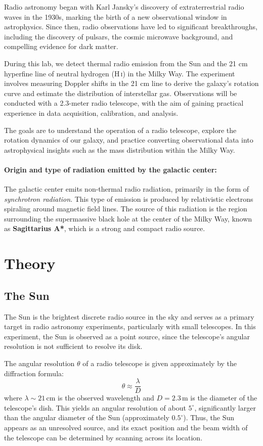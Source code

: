 \documentclass[12pt,a4paper]{article}
\begin{document}
Radio astronomy began with Karl Jansky's discovery of extraterrestrial radio waves in the 1930s, marking the birth of a new observational window in astrophysics. Since then, radio observations have led to significant breakthroughs, including the discovery of pulsars, the cosmic microwave background, and compelling evidence for dark matter.

During this lab, we detect thermal radio emission from the Sun and the 21 cm hyperfine line of neutral hydrogen (H\,\textsc{i}) in the Milky Way. The experiment involves measuring Doppler shifts in the 21 cm line to derive the galaxy's rotation curve and estimate the distribution of interstellar gas. Observations will be conducted with a 2.3-meter radio telescope, with the aim of gaining practical experience in data acquisition, calibration, and analysis.

The goals are to understand the operation of a radio telescope, explore the rotation dynamics of our galaxy, and practice converting observational data into astrophysical insights such as the mass distribution within the Milky Way.

\paragraph{\textbf{Origin and type of radiation emitted by the galactic center:}}
The galactic center emits non-thermal radio radiation, primarily in the form of \textit{synchrotron radiation}. This type of emission is produced by relativistic electrons spiraling around magnetic field lines. The source of this radiation is the region surrounding the supermassive black hole at the center of the Milky Way, known as \textbf{Sagittarius A*}, which is a strong and compact radio source.

\section{Theory}
\label{sec:theory}
  \subsection{The Sun}
  The Sun is the brightest discrete radio source in the sky and serves as a primary target in radio astronomy experiments, particularly with small telescopes. In this experiment, the Sun is observed as a point source, since the telescope's angular resolution is not sufficient to resolve its disk.

The angular resolution $\theta$ of a radio telescope is given approximately by the diffraction formula:
\[
\theta \approx \frac{\lambda}{D}
\]
where $\lambda \sim 21\,\mathrm{cm}$ is the observed wavelength and $D = 2.3\,\mathrm{m}$ is the diameter of the telescope's dish. This yields an angular resolution of about $5^\circ$, significantly larger than the angular diameter of the Sun (approximately $0.5^\circ$). Thus, the Sun appears as an unresolved source, and its exact position and the beam width of the telescope can be determined by scanning across its location.
\end{document}
